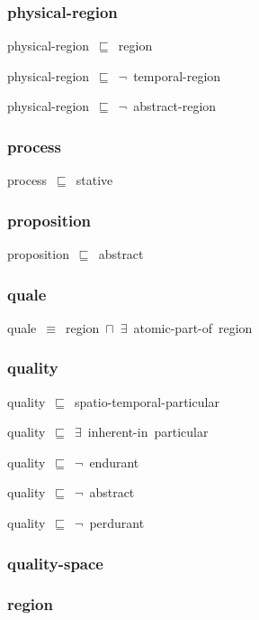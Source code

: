 \documentclass{article}
\begin{document}
\subsubsection*{physical-region}

physical-region~\ensuremath{\sqsubseteq}~region~

physical-region~\ensuremath{\sqsubseteq}~\ensuremath{\lnot}~temporal-region

physical-region~\ensuremath{\sqsubseteq}~\ensuremath{\lnot}~abstract-region

\subsubsection*{process}

process~\ensuremath{\sqsubseteq}~stative~

\subsubsection*{proposition}

proposition~\ensuremath{\sqsubseteq}~abstract~

\subsubsection*{quale}

quale~\ensuremath{\equiv}~region~\ensuremath{\sqcap}~\ensuremath{\exists}~atomic-part-of~region

\subsubsection*{quality}

quality~\ensuremath{\sqsubseteq}~spatio-temporal-particular~

quality~\ensuremath{\sqsubseteq}~\ensuremath{\exists}~inherent-in~particular~

quality~\ensuremath{\sqsubseteq}~\ensuremath{\lnot}~endurant

quality~\ensuremath{\sqsubseteq}~\ensuremath{\lnot}~abstract

quality~\ensuremath{\sqsubseteq}~\ensuremath{\lnot}~perdurant

\subsubsection*{quality-space}

\subsubsection*{region}
\end{document}
